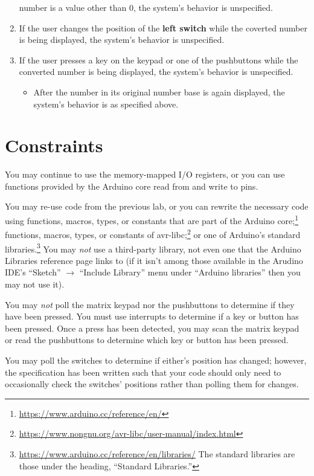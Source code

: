 \begin{enumerate}
    number is a value other than 0, the system's behavior is unspecified.
\item If the user changes the position of the \textbf{left switch} while the
    coverted number is being displayed, the system's behavior is unspecified.
\item If the user presses a key on the keypad or one of the pushbuttons while
    the converted number is being displayed, the system's behavior is
    unspecified.
    \begin{itemize}
    \item After the number in its original number base is again displayed, the
    system's behavior is as specified above.
    \end{itemize}
\end{enumerate}

\section{Constraints}\label{sec:Constraints}

You may continue to use the memory-mapped I/O registers, or you can use
functions provided by the Arduino core read from and write to pins.

You may re-use code from the previous lab, or you can rewrite the necessary
code using functions, macros, types, or constants that are part of the Arduino
core;\footnote{\url{https://www.arduino.cc/reference/en/}} functions, macros,
types, or constants of
avr-libc;\footnote{\url{https://www.nongnu.org/avr-libc/user-manual/index.html}}
or one of Arduino's standard
libraries.\footnote{\url{https://www.arduino.cc/reference/en/libraries/} The
standard libraries are those under the heading, ``Standard Libraries.''} You
may \textit{not} use a third-party library, not even one that the Arduino
Libraries reference page links to (if it isn't among those available in the
Arudino IDE's ``Sketch'' $\rightarrow$ ``Include Library'' menu under
``Arduino libraries'' then you may not use it).

You may \textit{not} poll the matrix keypad nor the pushbuttons to determine
if they have been pressed. You must use interrupts to determine if a key or
button has been pressed. Once a press has been detected, you may scan the
matrix keypad or read the pushbuttons to determine which key or button has
been pressed.

You may poll the switches to determine if either's position has changed;
however, the specification has been written such that your code should only
need to occasionally check the switches' positions rather than polling them for
changes.

